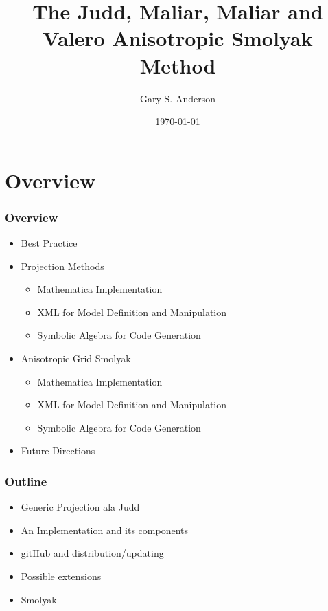 \documentclass[handout]{beamer}
\begin{document}
\title[The Anisotropic Smolyak Method]{The Judd, Maliar, Maliar and Valero Anisotropic Smolyak Method}


\author{Gary S. Anderson}
\date{\today} 


\frame{\titlepage}


\section{Overview}



\begin{frame}
  \frametitle{Overview}
  
  \begin{itemize}
  \item Best Practice
  \item Projection Methods
    \begin{itemize}
    \item Mathematica Implementation
  \item XML for Model Definition and Manipulation
  \item Symbolic Algebra for Code Generation
    \end{itemize}
  \item Anisotropic Grid Smolyak
    \begin{itemize}
    \item Mathematica Implementation
  \item XML for Model Definition and Manipulation
  \item Symbolic Algebra for Code Generation
    \end{itemize}
  \item Future Directions
  \end{itemize}
\end{frame}



\begin{frame}
  \frametitle{Outline}
  \begin{itemize}
  \item Generic Projection ala Judd
  \item An Implementation  and its components
  \item gitHub and distribution/updating
  \item Possible extensions

  \item Smolyak
  \end{itemize}
\end{frame}
\end{document}
